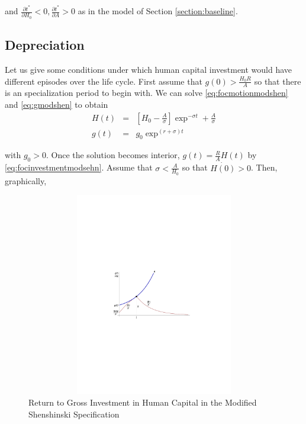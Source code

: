 \noindent and $\frac{\partial t^*}{\partial H_{0}} < 0, \frac{\partial t^*}{\partial A}> 0$ as in the model of Section \ref{section:baseline}. 
 
\subsection{Depreciation} \label{section:cycles}
Let us give some conditions under which human capital investment would have different episodes over the life cycle. First assume that $g(0) > \frac{H_{0} R}{A}$ so that there is an specialization period to begin with. We can solve \eqref{eq:focmotionmodshen} and \eqref{eq:gmodshen} to obtain
\begin{eqnarray}
H(t) &=& \left[ H_{0} - \frac{A}{\sigma} \right] \exp^{- \sigma t} + \frac{A}{\sigma} \nonumber \\
g(t) &=& g_{0} \exp^{(r + \sigma)t} \label{eq:gmodshent1} \nonumber
\end{eqnarray}

\noindent with $g_{0} > 0$. Once the solution becomes interior, $g(t) = \frac{R}{A} H(t)$ by \eqref{eq:focinvestmentmodsehn}. Assume that  $\sigma < \frac{A}{H_{0}}$ so that $\dot{H(0)} > 0$. Then, graphically,

\begin{center}
\begin{figure}[H]
\caption{Return to Gross Investment in Human Capital in the Modified Shenshinski Specification}
\centering
\includegraphics[width=4.5in, height=3.5in]{Figures/fig-shesh-for-intersection.pdf}
\end{figure}
\end{center}

